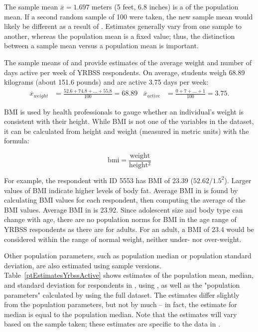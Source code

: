 \begin{spacing}{1.5}
The sample mean $\overline{x} = 1.697$ meters (5 feet, 6.8 inches) is a  of the population mean. If a second random sample of 100 were taken, the new sample mean would likely be different as a result of .  Estimates generally vary from one sample to another, whereas the population mean is a fixed value; thus, the distinction between a sample mean versus a population mean is important. 

The sample means of  and  provide estimates of the average weight and number of days active per week of YRBSS respondents. On average, students weigh 68.89 kilograms (about 151.6 pounds) and are active 3.75 days per week:
\begin{align*}
\overline{x}_{weight} &= \frac{52.6 + 74.8 + \dots + 55.8}{100} = 68.89
&\overline{x}_{active} &= \frac{0 + 7 + \dots + 1}{100} = 3.75.
\end{align*}

BMI is used by health professionals to gauge whether an individual's weight is consistent with their height. While BMI is not one of the variables in the dataset, it can be calculated from height and weight (measured in metric units) with the formula:

\[ \text{bmi} = \frac{\text{weight}}{\text{height}{^2}}\]

For example, the respondent with ID 5553 has BMI of 23.39 ($52.62/1.5^{2}$). Larger values of BMI indicate higher levels of body fat. Average BMI in  is found by calculating BMI values for each respondent, then computing the average of the BMI values. Average BMI in  is 23.92. Since adolescent size and body type can change with age, there are no population norms for BMI in the age range of YRBSS respondents as there are for adults.  For an adult, a BMI of 23.4 would be considered within the range of normal weight, neither under- nor over-weight.


Other population parameters, such as population median or population standard deviation, are also estimated using sample versions. Table~\ref{ptEstimatesYrbssActive} shows estimates of the population mean, median, and standard deviation for respondents in , using , as well as the "population parameters" calculated by using the full  dataset. The estimates differ slightly from the population parameters, but not by much -- in fact, the estimate for median is equal to the population median. Note that the estimates will vary based on the sample taken; these estimates are specific to the data in .


\end{spacing}
